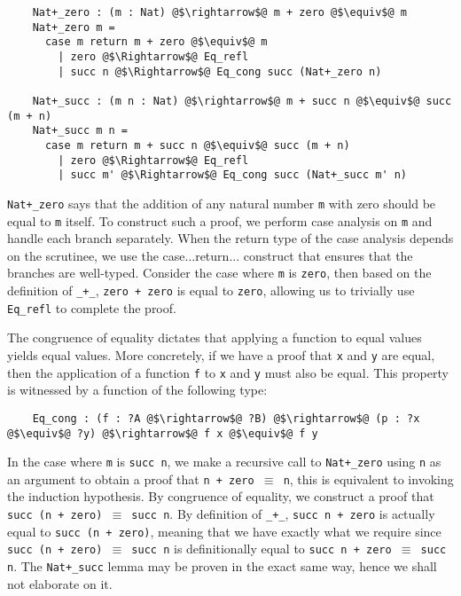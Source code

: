 \documentclass[12pt,twoside,maitrise]{dms}
\theoremstyle{definition}
\numberwithin{equation}{section}
\numberwithin{table}{chapter}
\numberwithin{figure}{chapter}
\newcommand\kw[1] {\textsf{#1}}
\newcommand\id[1] {\texttt{#1}}
\newcommand\fn[1] {\texttt{#1}}
\begin{document}
\begin{verbatim}
    Nat+_zero : (m : Nat) @$\rightarrow$@ m + zero @$\equiv$@ m
    Nat+_zero m =
      case m return m + zero @$\equiv$@ m
        | zero @$\Rightarrow$@ Eq_refl
        | succ n @$\Rightarrow$@ Eq_cong succ (Nat+_zero n)

    Nat+_succ : (m n : Nat) @$\rightarrow$@ m + succ n @$\equiv$@ succ (m + n)
    Nat+_succ m n =
      case m return m + succ n @$\equiv$@ succ (m + n)
        | zero @$\Rightarrow$@ Eq_refl
        | succ m' @$\Rightarrow$@ Eq_cong succ (Nat+_succ m' n)
\end{verbatim}

\id{Nat+\_zero} says that the addition of any natural number \id{m} with zero
should be equal to \id{m} itself. To construct such a proof, we perform case
analysis on \id{m} and handle each branch separately. When the return type of
the case analysis depends on the scrutinee, we use the \kw{case...return...}
construct that ensures that the branches are well-typed. Consider the case where
\id{m} is \id{zero}, then based on the definition of \id{\_+\_}, \fn{zero +
  zero} is equal to \id{zero}, allowing us to trivially use \id{Eq\_refl} to
complete the proof.

The congruence of equality dictates that applying a function to equal values
yields equal values. More concretely, if we have a proof that \id{x} and \id{y}
are equal, then the application of a function \id{f} to \id{x} and \id{y} must
also be equal. This property is witnessed by a function of the following type:

\begin{verbatim}
    Eq_cong : (f : ?A @$\rightarrow$@ ?B) @$\rightarrow$@ (p : ?x @$\equiv$@ ?y) @$\rightarrow$@ f x @$\equiv$@ f y
\end{verbatim}

In the case where \id{m} is \fn{succ n}, we make a recursive call to
\id{Nat+\_zero} using \id{n} as an argument to obtain a proof that \fn{n + zero
  $\equiv$ n}, this is equivalent to invoking the induction hypothesis. By
congruence of equality, we construct a proof that \fn{succ (n + zero) $\equiv$
  succ n}. By definition of \id{\_+\_}, \fn{succ n + zero} is actually equal to
\fn{succ (n + zero)}, meaning that we have exactly what we require since
\fn{succ (n + zero) $\equiv$ succ n} is definitionally equal to \fn{succ n +
  zero $\equiv$ succ n}. The \id{Nat+\_succ} lemma may be proven in the exact
same way, hence we shall not elaborate on it.
\end{document}
